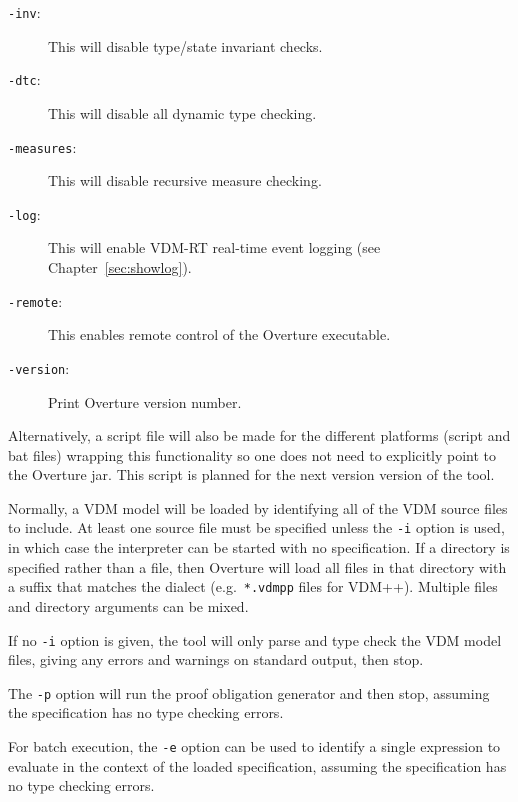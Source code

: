 \documentclass{overturerepchap}
\begin{document}
\begin{description}
\item[\texttt{-inv}:] This will disable type/state invariant checks.
\item[\texttt{-dtc}:] This will disable all dynamic type checking.
\item[\texttt{-measures}:] This will disable recursive measure checking.
\item[\texttt{-log}:] This will enable VDM-RT real-time event logging (see Chapter~\ref{sec:showlog}).
\item[\texttt{-remote}:] This enables remote control of the Overture executable.
\item[\texttt{-version}:] Print Overture version number.
\end{description}

Alternatively, a script file will also be made for the different platforms
(script and bat files) wrapping this functionality so one does not need to
explicitly point to the Overture jar.  This script is planned for the next
version version of the tool.

Normally, a VDM model will be loaded by identifying all of the VDM source files
to include. At least one source file must be specified unless the \texttt{-i}
option is used, in which case the interpreter can be started with no
specification. If a directory is specified rather than a file, then Overture
will load all files in that directory with a suffix that matches the dialect
(e.g.\ \texttt{*.vdmpp} files for VDM++).  Multiple files and directory
arguments can be mixed.

If no \texttt{-i} option is given, the tool will only parse and type check
the VDM model files, giving any errors and warnings on
standard output, then stop.

The \texttt{-p} option will run the proof obligation generator and
then stop, assuming the specification has no type checking errors.

For batch execution, the \texttt{-e} option can be used to identify a
single expression to evaluate in the context of the loaded
specification, assuming the specification has no type checking errors.


\end{document}
